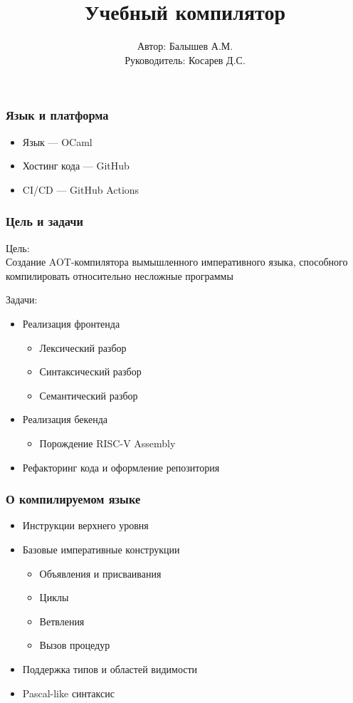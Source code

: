 \documentclass{beamer}
\title{Учебный компилятор}
\author[Балышев А.М.]{Автор: Балышев А.М.\\ Руководитель: Косарев Д.С.}
\begin{document}
	
	\begin{frame}[plain]
		\maketitle
	\end{frame}
	
	\begin{frame}
	\frametitle{Язык и платформа}
	\begin{itemize}
			\item Язык — OCaml
			\item Хостинг кода — GitHub
			\item CI/CD — GitHub Actions
		\end{itemize}
	\end{frame}
	
	\begin{frame}
		\frametitle{Цель и задачи}
		Цель:
		\\
		Создание AOT-компилятора вымышленного императивного языка, способного компилировать относительно несложные программы 
		
		Задачи:\\
		\begin{itemize}
			\item Реализация фронтенда
			\begin{itemize}
				\item Лексический разбор
				\item Синтаксический разбор
				\item Семантический разбор
			\end{itemize}
			\item Реализация бекенда
			\begin{itemize}
				\item Порождение RISC-V Assembly
			\end{itemize}
			\item Рефакторинг кода и оформление репозитория
		\end{itemize}
		
	\end{frame}
	
		\begin{frame}
		\frametitle{О компилируемом языке}
		\begin{itemize}
			\item Инструкции верхнего уровня
			\item Базовые императивные конструкции
			\begin{itemize}
				\item Объявления и присваивания
				\item Циклы
				\item Ветвления
				\item Вызов процедур
			\end{itemize}
			\item Поддержка типов и областей видимости
			\item Pascal-like синтаксис
		\end{itemize}
	\end{frame}
	
\end{document}
